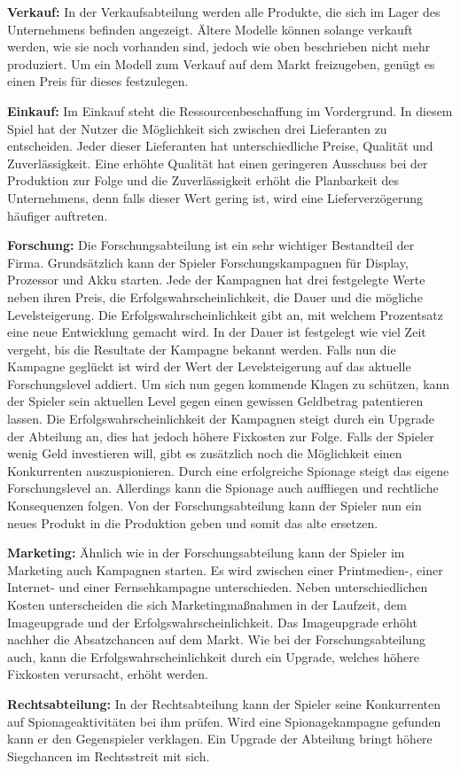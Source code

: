 \textbf{Verkauf:} 
In der Verkaufsabteilung werden alle Produkte, die sich im Lager des Unternehmens befinden angezeigt. Ältere Modelle können solange verkauft werden, wie sie noch vorhanden sind, jedoch wie oben beschrieben nicht mehr produziert. Um ein Modell zum Verkauf auf dem Markt freizugeben, genügt es einen Preis für dieses festzulegen.

\textbf{Einkauf:} 
Im Einkauf steht die Ressourcenbeschaffung im Vordergrund. In diesem Spiel hat der Nutzer die Möglichkeit sich zwischen drei Lieferanten zu entscheiden. Jeder dieser Lieferanten hat unterschiedliche Preise, Qualität und Zuverlässigkeit. Eine erhöhte Qualität hat einen geringeren Ausschuss bei der Produktion zur Folge und die Zuverlässigkeit erhöht die Planbarkeit des Unternehmens, denn falls dieser Wert gering ist, wird eine Lieferverzögerung häufiger auftreten.

\textbf{Forschung:} 
Die Forschungsabteilung ist ein sehr wichtiger Bestandteil der Firma. Grundsätzlich kann der Spieler Forschungskampagnen für Display, Prozessor und Akku starten. Jede der Kampagnen hat drei festgelegte Werte neben ihren Preis, die Erfolgswahrscheinlichkeit, die Dauer und die mögliche Levelsteigerung. Die Erfolgswahrscheinlichkeit gibt an, mit welchem Prozentsatz  eine neue Entwicklung gemacht wird. In der Dauer ist festgelegt wie viel Zeit vergeht, bis die Resultate der Kampagne bekannt werden. Falls nun die Kampagne geglückt ist wird der Wert der Levelsteigerung auf das aktuelle Forschungslevel addiert. Um sich nun gegen kommende Klagen zu schützen, kann der Spieler sein aktuellen Level gegen einen gewissen Geldbetrag patentieren lassen. Die Erfolgswahrscheinlichkeit der Kampagnen steigt durch ein Upgrade der Abteilung an, dies hat jedoch höhere Fixkosten zur Folge. Falls der Spieler wenig Geld investieren will, gibt es zusätzlich noch die Möglichkeit einen Konkurrenten auszuspionieren. Durch eine erfolgreiche Spionage steigt das eigene Forschungslevel an. Allerdings kann die Spionage auch auffliegen und rechtliche Konsequenzen folgen. Von der Forschungsabteilung kann der Spieler nun ein neues Produkt in die Produktion geben und somit das alte ersetzen.

\textbf{Marketing: }
Ähnlich wie in der Forschungsabteilung kann der Spieler im Marketing auch Kampagnen starten. Es wird zwischen einer Printmedien-, einer Internet- und einer Fernsehkampagne unterschieden. Neben unterschiedlichen Kosten unterscheiden die sich Marketingmaßnahmen in der Laufzeit, dem Imageupgrade und der Erfolgswahrscheinlichkeit. Das Imageupgrade erhöht nachher die Absatzchancen auf dem Markt. Wie bei der Forschungsabteilung auch, kann die Erfolgswahrscheinlichkeit durch ein Upgrade, welches höhere Fixkosten verursacht, erhöht werden.

\textbf{Rechtsabteilung:} 
In der Rechtsabteilung kann der Spieler seine Konkurrenten auf Spionageaktivitäten bei ihm prüfen. Wird eine Spionagekampagne gefunden kann er den Gegenspieler verklagen. Ein Upgrade der Abteilung bringt höhere Siegchancen im Rechtsstreit mit sich.







